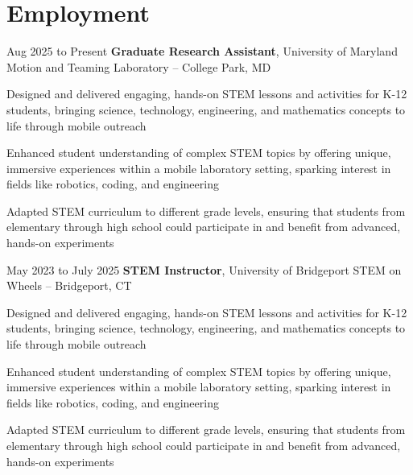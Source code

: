 \section{Employment}
    \begin{twocolentry}{
        Aug 2025 to Present
    }
        \textbf{Graduate Research Assistant}, University of Maryland Motion and Teaming Laboratory -- College Park, MD\end{twocolentry}

    \vspace{0.10 cm}
    \begin{onecolentry}
        \begin{highlights}
          \item Designed and delivered engaging, hands-on STEM lessons and activities for K-12 students, bringing science, technology, engineering, and mathematics concepts to life through mobile outreach
          \item Enhanced student understanding of complex STEM topics by offering unique, immersive experiences within a mobile laboratory setting, sparking interest in fields like robotics, coding, and engineering
          \item Adapted STEM curriculum to different grade levels, ensuring that students from elementary through high school could participate in and benefit from advanced, hands-on experiments
        \end{highlights}
    \end{onecolentry}  
    
    \vspace{0.2 cm}

    \begin{twocolentry}{
        May 2023 to July 2025
    }
        \textbf{STEM Instructor}, University of Bridgeport STEM on Wheels -- Bridgeport, CT\end{twocolentry}

    \vspace{0.10 cm}
    \begin{onecolentry}
        \begin{highlights}
          \item Designed and delivered engaging, hands-on STEM lessons and activities for K-12 students, bringing science, technology, engineering, and mathematics concepts to life through mobile outreach
          \item Enhanced student understanding of complex STEM topics by offering unique, immersive experiences within a mobile laboratory setting, sparking interest in fields like robotics, coding, and engineering
          \item Adapted STEM curriculum to different grade levels, ensuring that students from elementary through high school could participate in and benefit from advanced, hands-on experiments
        \end{highlights}
    \end{onecolentry}  
    
